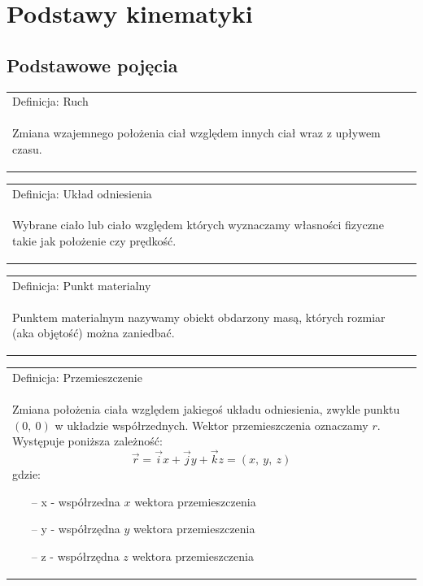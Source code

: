 \documentclass[a4paper]{article}
\newenvironment{definition}[1][title]
    {
        \begin{center}
        \begin{tabular}{|p{1\textwidth}|}
        \hline
            Definicja: #1\\[2ex]
        \begin{em}
        \Large
    }
    { 
        \end{em}
        \\\hline
        \end{tabular} 
        \end{center}
    }
\begin{document}
\section{\huge Podstawy kinematyki}
    \subsection{\LARGE Podstawowe pojęcia}
        \Large
        \begin{definition}[Ruch]
            Zmiana wzajemnego położenia ciał względem innych ciał wraz z upływem czasu.
        \end{definition}
        \begin{definition}[Układ odniesienia]
            Wybrane ciało lub ciało względem których wyznaczamy własności fizyczne takie jak położenie czy prędkość.
        \end{definition}
        \begin{definition}[Punkt materialny]
            Punktem materialnym nazywamy obiekt obdarzony masą, których rozmiar (aka objętość) można zaniedbać.
        \end{definition}
        \begin{definition}[Przemieszczenie]
            Zmiana położenia ciała względem jakiegoś układu odniesienia, zwykle punktu $(0,\ 0)$ w układzie współrzednych. 
            Wektor przemieszczenia oznaczamy $r$. Występuje poniższa zależność:
            \[\vec{r} = \vec{i}x + \vec{j}y + \vec{k}z = (x,\ y,\ z)\]
            gdzie:
            \begin{itemize}
                \item[--] x - współrzedna $x$ wektora przemieszczenia
                \item[--] y - współrzędna $y$ wektora przemieszczenia
                \item[--] z - współrzędna $z$ wektora przemieszczenia
            \end{itemize}
        \end{definition}
\end{document}
